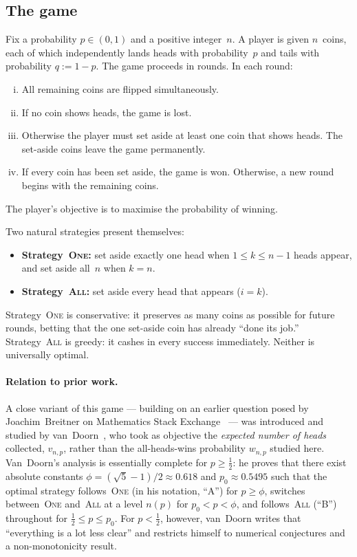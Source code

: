 \documentclass[12pt]{article}
\theoremstyle{definition}
\theoremstyle{remark}
\newcommand{\One}{\textsc{One}}
\newcommand{\All}{\textsc{All}}
\begin{document}
\subsection{The game}

Fix a probability $p\in(0,1)$ and a positive integer~$n$.  A player
is given $n$~coins, each of which independently lands heads with
probability~$p$ and tails with probability $q:=1-p$.  The game
proceeds in rounds.  In each round:
\begin{enumerate}[(i)]
\item All remaining coins are flipped simultaneously.
\item If no coin shows heads, the game is lost.
\item Otherwise the player must set aside at least one coin that
  shows heads.  The set-aside coins leave the game permanently.
\item If every coin has been set aside, the game is won.
  Otherwise, a new round begins with the remaining coins.
\end{enumerate}
The player's objective is to maximise the probability of winning.

Two natural strategies present themselves:
\begin{itemize}
\item \textbf{Strategy~\One:} set aside exactly one head when
  $1\le k\le n-1$ heads appear, and set aside all~$n$ when $k=n$.
\item \textbf{Strategy~\All:} set aside every head that appears
  ($i=k$).
\end{itemize}
Strategy~\One{} is conservative: it preserves as many coins as
possible for future rounds, betting that the one set-aside coin has
already ``done its job.''  Strategy~\All{} is greedy: it cashes in
every success immediately.  Neither is universally optimal.

\paragraph{Relation to prior work.}
\sloppy A close variant of this game --- building on an earlier
question posed by Joachim~Breitner on Mathematics Stack
Exchange~\cite{Breitner2015} --- was introduced and studied by
van~Doorn~\cite{vanDoorn2024}, who took as objective the
\emph{expected number of heads} collected, $v_{n,p}$, rather than
the all-heads-wins probability $w_{n,p}$ studied here.  Van~Doorn's
analysis is essentially complete for $p\ge\tfrac12$: he proves
that there exist absolute constants $\phi=(\sqrt5-1)/2\approx
0.618$ and $p_0\approx 0.5495$ such that the optimal strategy
follows~\One{} (in his notation, ``A'') for $p\ge\phi$, switches
between~\One{} and~\All{} at a level $n(p)$ for $p_0<p<\phi$, and
follows~\All{} (``B'') throughout for $\tfrac12\le p\le p_0$.  For
$p<\tfrac12$, however, van~Doorn writes that ``everything is a lot
less clear'' and restricts himself to numerical conjectures and a
non-monotonicity result.
\end{document}
